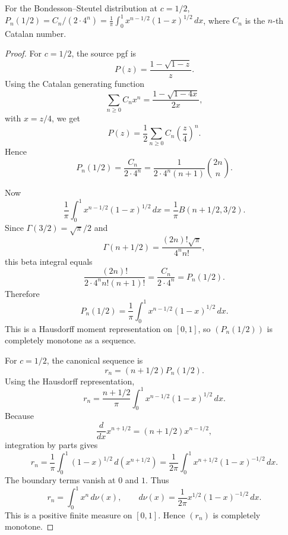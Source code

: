 \begin{proposition}
\label{res:bs-c-half-catalan-hausdorff-representation}
For the Bondesson--Steutel distribution at \(c=1/2\), \(P_n(1/2)=C_n/(2\cdot4^n)=\frac{1}{\pi}\int_0^1 x^{n-1/2}(1-x)^{1/2}\,dx\), where \(C_n\) is the \(n\)-th Catalan number.
\end{proposition}
\begin{proof}
For \(c=1/2\), the source pgf is
\[
P(z)=\frac{1-\sqrt{1-z}}{z}.
\]
Using the Catalan generating function
\[
\sum_{n\ge0}C_n x^n=\frac{1-\sqrt{1-4x}}{2x},
\]
with \(x=z/4\), we get
\[
P(z)=\frac12\sum_{n\ge0}C_n\left(\frac z4\right)^n.
\]
Hence
\[
P_n(1/2)=\frac{C_n}{2\cdot4^n}
=\frac{1}{2\cdot4^n(n+1)}\binom{2n}{n}.
\]

Now
\[
\frac1\pi\int_0^1 x^{n-1/2}(1-x)^{1/2}\,dx
=\frac1\pi B(n+1/2,3/2).
\]
Since \(\Gamma(3/2)=\sqrt\pi/2\) and
\[
\Gamma(n+1/2)=\frac{(2n)!\sqrt\pi}{4^n n!},
\]
this beta integral equals
\[
\frac{(2n)!}{2\cdot4^n n!(n+1)!}
=\frac{C_n}{2\cdot4^n}
=P_n(1/2).
\]
Therefore
\[
P_n(1/2)=\frac1\pi\int_0^1 x^{n-1/2}(1-x)^{1/2}\,dx.
\]
This is a Hausdorff moment representation on \([0,1]\), so \((P_n(1/2))\) is completely monotone as a sequence.

For \(c=1/2\), the canonical sequence is
\[
r_n=(n+1/2)P_n(1/2).
\]
Using the Hausdorff representation,
\[
r_n=\frac{n+1/2}{\pi}\int_0^1 x^{n-1/2}(1-x)^{1/2}\,dx.
\]
Because
\[
\frac{d}{dx}x^{n+1/2}=(n+1/2)x^{n-1/2},
\]
integration by parts gives
\[
r_n
=\frac1\pi\int_0^1 (1-x)^{1/2}\,d(x^{n+1/2})
=\frac{1}{2\pi}\int_0^1 x^{n+1/2}(1-x)^{-1/2}\,dx.
\]
The boundary terms vanish at \(0\) and \(1\). Thus
\[
r_n=\int_0^1 x^n\,d\nu(x),
\qquad
d\nu(x)=\frac{1}{2\pi}x^{1/2}(1-x)^{-1/2}\,dx.
\]
This is a positive finite measure on \([0,1]\). Hence \((r_n)\) is completely monotone.
\end{proof}

